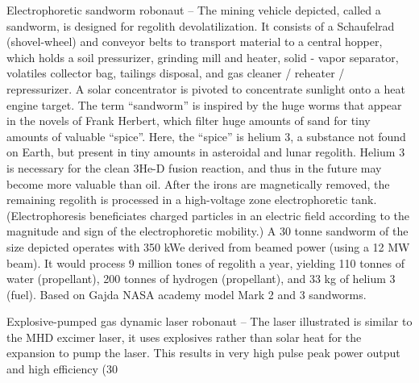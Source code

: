 \documentclass[a4paper]{book}
\begin{document}
Electrophoretic sandworm robonaut – The mining vehicle depicted, called a sandworm, is designed for regolith devolatilization.  It consists of a Schaufelrad (shovel-wheel) and conveyor belts to transport material to a central hopper, which holds a soil pressurizer, grinding mill and heater, solid - vapor separator, volatiles collector bag, tailings disposal, and gas cleaner / reheater / repressurizer. A solar concentrator is pivoted to concentrate sunlight onto a heat engine target. The term “sandworm” is inspired by the huge worms that appear in the novels of Frank Herbert, which filter huge amounts of sand for tiny amounts of valuable “spice”. Here, the “spice” is helium 3, a substance not found on Earth, but present in tiny amounts in asteroidal and lunar regolith. Helium 3 is necessary for the clean 3He-D fusion reaction, and thus in the future may become more valuable than oil.  After the irons are magnetically removed, the remaining regolith is processed in a high-voltage zone electrophoretic tank. (Electrophoresis beneficiates charged particles in an electric field according to the magnitude and sign of the electrophoretic mobility.)  A 30 tonne sandworm of the size depicted operates with 350 kWe derived from beamed power (using a 12 MW beam). It would process 9 million tones of regolith a year, yielding 110 tonnes of water (propellant), 200 tonnes of hydrogen (propellant), and 33 kg of helium 3 (fuel). Based on Gajda NASA academy model Mark 2 and 3 sandworms.
 
Explosive-pumped gas dynamic laser robonaut –  The laser illustrated is similar to the MHD excimer laser, it uses explosives rather than solar heat for the expansion to pump the laser. This results in very high pulse peak power output and high efficiency (30%
 
\end{document}
